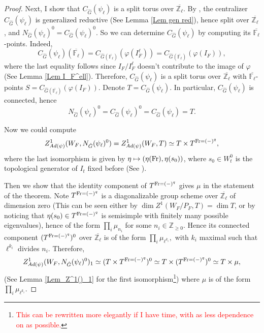 \begin{theorem}
\begin{proof}
    	Next, I show that $C_{\hat{G}}(\psi_{\ell})$ is a split torus over $\overline{\mathbb{Z}_{\ell}}$. By \cite[Subsection 3.1]{dat2022ihes}, the centralizer $C_{\hat{G}}(\psi_{\ell})$ is generalized reductive (See Lemma \ref{Lem gen red}), hence split over $\overline{\mathbb{Z}_{\ell}}$, and $N_{\hat{G}}(\psi_{\ell})^0=C_{\hat{G}}(\psi_{\ell})^0$. So we can determine $C_{\hat{G}}(\psi_{\ell})$ by computing its $\overline{\mathbb{F}_{\ell}}$-points. Indeed,
    	$$C_{\hat{G}}(\psi_{\ell})(\overline{\mathbb{F}_{\ell}})=C_{\hat{G}(\overline{\mathbb{F}_{\ell}})}(\varphi(I_F^\ell))=C_{\hat{G}(\overline{\mathbb{F}_{\ell}})}(\varphi(I_F)),$$
    	where the last equality follows since $I_F/I_F^{\ell}$ doesn't contribute to the image of $\varphi$ (See Lemma \ref{Lem I_F^ell}). Therefore, $C_{\hat{G}}(\psi_{\ell})$ is a split torus over $\overline{\mathbb{Z}_{\ell}}$ with $\overline{\mathbb{F}_{\ell}}$-points $S=C_{\hat{G}(\overline{\mathbb{F}_{\ell}})}(\varphi(I_F))$. Denote $T=C_{\hat{G}}(\psi_{\ell})$. In particular, $C_{\hat{G}}(\psi_{\ell})$  is connected, hence 
    	$$N_{\hat{G}}(\psi_{\ell})^0=C_{\hat{G}}(\psi_{\ell})^0=C_{\hat{G}}(\psi_{\ell})=T.$$
    	
    	Now we could compute
    	$$Z^1_{Ad(\psi)}(W_F, N_{\hat{G}}(\psi_{\ell})^0)=Z^1_{Ad(\psi)}(W_F, T) \simeq T \times T^{\operatorname{Fr}=(-)^q},$$
    	where the last isomorphism is given by $\eta \mapsto (\eta(\operatorname{Fr}), \eta(s_0))$, where $s_0 \in W_t^0$ is the topological generator of $I_t$ fixed before (See \cite[Example 3.14]{dat2022ihes}).
    	
    	Then we show that the identity component of $T^{\operatorname{Fr}=(-)^q}$ gives $\mu$ in the statement of the theorem. Note $T^{\operatorname{Fr}=(-)^q}$ is a diagonalizable group scheme over $\overline{\mathbb{Z}_{\ell}}$ of dimension zero (This can be seen either by $\dim Z^1(W_F/P_F, T)=\dim T$, or by noticing that $\eta(s_0) \in T^{\operatorname{Fr}=(-)^q}$ is semisimple with finitely many possible eigenvalues), hence of the form $\prod_i\mu_{n_i}$ for some $n_i \in \mathbb{Z}_{\geq 0}$. Hence its connected component $(T^{\operatorname{Fr}=(-)^q})^0$ over $\overline{\mathbb{Z}_{\ell}}$ is of the form $\prod_i\mu_{\ell^{k_i}},$ with $k_i$ maximal such that $\ell^{k_i}$ divides $n_i$. Therefore, 
    	$$Z^1_{Ad(\psi)}(W_F, N_{\hat{G}}(\psi_{\ell})^0)_1 \simeq (T \times T^{\operatorname{Fr}=(-)^q})^0 \simeq T \times (T^{\operatorname{Fr}=(-)^q})^0 \simeq T \times \mu,$$
    	(See Lemma \ref{Lem_Z^1()_1} for the first isomorphism\footnote{\textcolor{red}{This can be rewritten more elegantly if I have time, with as less dependence on \cite{dat2022ihes} as possible.}}) where $\mu$ is of the form $\prod_i\mu_{\ell^{k_i}}$.
    	

\end{proof}
\end{theorem}
